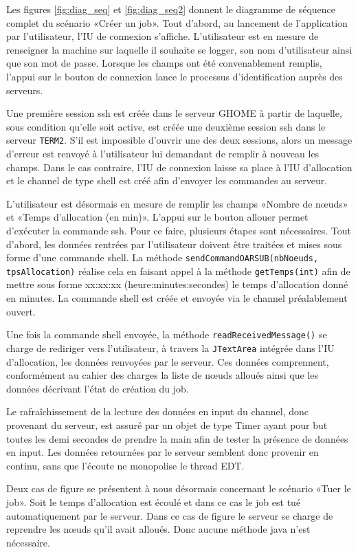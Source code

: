 \par Les figures \ref{fig:diag_seq} et \ref{fig:diag_seq2} donnent le diagramme de séquence complet du scénario «Créer un job».  Tout d'abord, au lancement de l’application par l’utilisateur, l’IU de connexion s’affiche. L’utilisateur est en mesure de renseigner la machine sur laquelle il souhaite se logger, son nom d’utilisateur ainsi que son mot de passe. Lorsque les champs ont été convenablement remplis, l’appui sur le bouton de connexion lance le processus d’identification auprès des serveurs.
\par Une première session ssh est créée dans le serveur GHOME à partir de laquelle, sous condition qu’elle soit active, est créée une deuxième session ssh dans le serveur \texttt{TERM2}. S’il est impossible d’ouvrir une des deux sessions, alors un message d’erreur est renvoyé à l’utilisateur lui demandant de remplir à nouveau les champs. Dans le cas contraire, l’IU de connexion laisse sa place à l’IU d’allocation et le channel de type shell est créé afin d’envoyer les commandes au serveur.
\par L’utilisateur est désormais en mesure de remplir les champs «Nombre de nœuds» et «Temps d’allocation (en min)». L’appui sur le bouton allouer permet d’exécuter la commande ssh. Pour ce faire, plusieurs étapes sont nécessaires. Tout d’abord, les données rentrées par l’utilisateur doivent être traitées et mises sous forme d’une commande shell. La méthode \texttt{sendCommandOARSUB(nbNoeuds, tpsAllocation)} réalise cela en faisant appel à la méthode \texttt{getTemps(int)} afin de mettre sous forme xx:xx:xx (heure:minutes:secondes) le temps d’allocation donné en minutes. La commande shell est créée et envoyée via le channel préalablement ouvert.
\par Une fois la commande shell envoyée, la méthode \texttt{readReceivedMessage()} se charge de rediriger vers l’utilisateur, à travers la \texttt{JTextArea} intégrée dans l’IU d’allocation, les données  renvoyées par le serveur. Ces données comprennent, conformément au cahier des charges la liste de nœuds alloués ainsi que les données décrivant l’état de création du job. 
\par Le rafraîchissement de la lecture des données en input du channel, donc provenant du serveur, est assuré par un objet de type Timer ayant pour but toutes les demi secondes de prendre la main afin de tester la présence de données en input. Les données retournées par le serveur semblent donc provenir en continu, sans que l'écoute ne monopolise le thread EDT.
\par Deux cas de figure se présentent à nous désormais concernant le scénario «Tuer le job». Soit le temps d’allocation est écoulé et dans ce cas le job est tué automatiquement par le serveur. Dans ce cas de figure le serveur se charge de reprendre les nœuds qu’il avait alloués. Donc aucune méthode java n’est nécessaire. 
